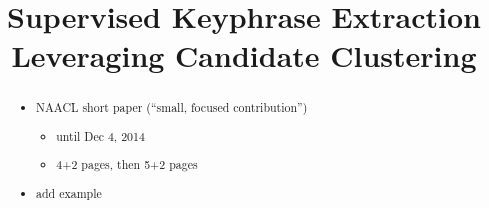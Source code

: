 \documentclass[11pt,letterpaper]{article}
\title{Supervised Keyphrase Extraction Leveraging Candidate Clustering}
\date{}
\begin{document}
  \maketitle

  \begin{abstract}
    \begin{itemize}
      \item{NAACL short paper (``small, focused contribution'')}
      \begin{itemize}
        \item{until Dec 4, 2014}
        \item{4+2 pages, then 5+2 pages}
      \end{itemize}
      \item{add example}
    \end{itemize}
  \end{abstract}

  
  
  
  
  


  
  
\end{document}
